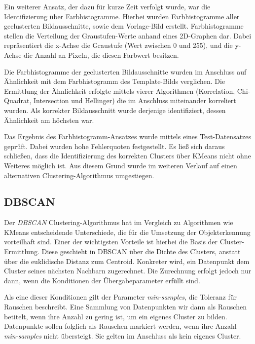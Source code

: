 \documentclass[
    type=Projektarbeit,
    status=draft, %
    language=german, %
    bibengine=bibtex,
]{unibwm-inf-thesis}
\begin{document}
    Ein weiterer Ansatz, der dazu für kurze Zeit verfolgt wurde, war die Identifizierung über Farbhistogramme.
    Hierbei wurden Farbhistogramme aller geclusterten Bildausschnitte, sowie dem Vorlage-Bild erstellt.
    Farbhistogramme stellen die Verteilung der Graustufen-Werte anhand eines 2D-Graphen dar.
    Dabei repräsentiert die x-Achse die Graustufe (Wert zwischen 0 und 255), und die y-Achse die Anzahl an Pixeln, die diesen Farbwert besitzen.

    Die Farbhistogramme der geclusterten Bildausschnitte wurden im Anschluss auf Ähnlichkeit mit dem Farbhistogramm des Template-Bilds verglichen.
    Die Ermittlung der Ähnlichkeit erfolgte mittels vierer Algorithmen (Korrelation, Chi-Quadrat, Intersection und Hellinger) die im Anschluss miteinander korreliert wurden.
    Als korrekter Bildausschnitt wurde derjenige identifiziert, dessen Ähnlichkeit am höchsten war.

    Das Ergebnis des Farbhistogramm-Ansatzes wurde mittels eines Test-Datensatzes geprüft.
    Dabei wurden hohe Fehlerquoten festgestellt.
    Es ließ sich daraus schließen, dass die Identifizierung des korrekten Clusters über KMeans nicht ohne Weiteres möglich ist.
    Aus diesem Grund wurde im weiteren Verlauf auf einen alternativen Clustering-Algorithmus umgestiegen.

    \subsection{DBSCAN}\label{subsec:dbscan}
    Der \textit{DBSCAN} Clustering-Algorithmus hat im Vergleich zu Algorithmen wie KMeans entscheidende Unterschiede, die für die Umsetzung der Objekterkennung vorteilhaft sind.
    Einer der wichtigsten Vorteile ist hierbei die Basis der Cluster-Ermittlung.
    Diese geschieht in DBSCAN über die Dichte des Clusters, anstatt über die euklidische Distanz zum Centroid.
    Konkreter wird, ein Datenpunkt dem Cluster seines nächsten Nachbarn zugerechnet.
    Die Zurechnung erfolgt jedoch nur dann, wenn die Konditionen der Übergabeparameter erfüllt sind.

    Als eine dieser Konditionen gilt der Parameter \textit{min-samples}, die Toleranz für Rauschen beschreibt.
    Eine Sammlung von Datenpunkten wir dann als Rauschen betitelt, wenn ihre Anzahl zu gering ist, um ein eigenes Cluster zu bilden.
    Datenpunkte sollen folglich als Rauschen markiert werden, wenn ihre Anzahl \textit{min-samples} nicht übersteigt.
    Sie gelten im Anschluss als kein eigenes Cluster.
\end{document}
